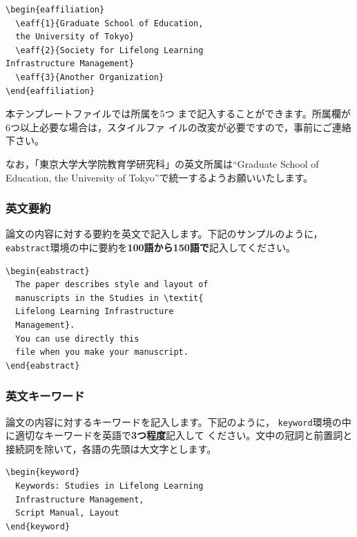 \documentclass[b5paper,10pt,twocolumn,tombow]{jarticle}
\begin{document}
\begin{verbatim}
\begin{eaffiliation}
  \eaff{1}{Graduate School of Education,
  the University of Tokyo}
  \eaff{2}{Society for Lifelong Learning
Infrastructure Management}
  \eaff{3}{Another Organization}
\end{eaffiliation}
\end{verbatim}
本テンプレートファイルでは所属を5つ
まで記入することができます。所属欄が6つ以上必要な場合は，スタイルファ
イルの改変が必要ですので，事前にご連絡下さい。

なお，「東京大学大学院教育学研究科」の英文所属は``Graduate School of
Education, the University of
Tokyo''で統一するようお願いいたします。

\subsubsection{英文要約}
論文の内容に対する要約を英文で記入します。下記のサンプルのように，
\texttt{eabstract}環境の中に要約を\textbf{100語から150語で}記入してください。


\begin{verbatim}
\begin{eabstract}
  The paper describes style and layout of
  manuscripts in the Studies in \textit{
  Lifelong Learning Infrastructure
  Management}.
  You can use directly this
  file when you make your manuscript.
\end{eabstract}
\end{verbatim}


\subsubsection{英文キーワード}
論文の内容に対するキーワードを記入します。下記のように，
\texttt{keyword}環境の中に適切なキーワードを英語で\textbf{3つ程度}記入して
ください。文中の冠詞と前置詞と接続詞を除いて，各語の先頭は大文字とします。

\begin{verbatim}
\begin{keyword}
  Keywords: Studies in Lifelong Learning
  Infrastructure Management,
  Script Manual, Layout
\end{keyword}
\end{verbatim}
\end{document}
